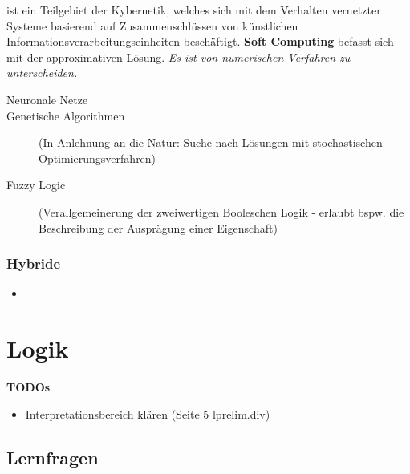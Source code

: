 \documentclass[runningheads,deutsch]{llncs}
\begin{document}
ist ein Teilgebiet der Kybernetik, welches sich mit dem Verhalten vernetzter Systeme basierend auf Zusammenschlüssen von künstlichen Informationsverarbeitungseinheiten beschäftigt. \textbf{Soft Computing} befasst sich mit der approximativen Lösung. \textit{Es ist von numerischen Verfahren zu unterscheiden.}

\begin{description}
    \item[ Neuronale Netze]
    \item[ Genetische Algorithmen ] (In Anlehnung an die Natur: Suche nach Lösungen mit stochastischen Optimierungsverfahren)
    \item[ Fuzzy Logic ] (Verallgemeinerung der zweiwertigen Booleschen Logik - erlaubt bspw. die Beschreibung der Ausprägung einer Eigenschaft)
\end{description}

\subsubsection{Hybride}

\begin{itemize}
    \item 
\end{itemize}

\section{Logik}


\textbf{TODOs}
\begin{itemize}
    \item Interpretationsbereich klären (Seite 5 lprelim.div)
\end{itemize}

\subsection{Lernfragen}
\end{document}
